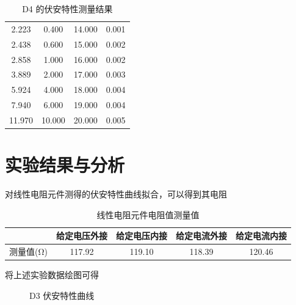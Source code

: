 \documentclass[a4paper,utf8]{article}
\begin{document}
\begin{table}[!ht]
{\begin{tabular}{*{4}{S[table-format=2.3]}}
            2.223  & 0.400  & 14.000  & 0.001   \\ 
            2.438  & 0.600  & 15.000  & 0.002   \\ 
            2.858  & 1.000  & 16.000  & 0.002   \\ 
            3.889  & 2.000  & 17.000  & 0.003   \\ 
            5.924  & 4.000  & 18.000  & 0.004   \\ 
            7.940  & 6.000  & 19.000  & 0.004   \\ 
            11.970  & 10.000  & 20.000  & 0.005   \\ \bottomrule
        \end{tabular}}
        \caption{D4 的伏安特性测量结果}
    \end{table}

\section{实验结果与分析}
对线性电阻元件测得的伏安特性曲线拟合，可以得到其电阻
\begin{table}[!ht]
    \caption{线性电阻元件电阻值测量值}
    \begin{tabular}{ccccc} \toprule
         & 给定电压外接 & 给定电压内接 & 给定电流外接 & 给定电流内接 \\ \midrule
        测量值(\unit{\ohm}) & 117.92 & 119.10 & 118.39 & 120.46 \\ \bottomrule
    \end{tabular}
\end{table}
将上述实验数据绘图可得\par
\begin{figure}[!ht]
    \caption{D3 伏安特性曲线}
\end{figure}
\end{document}
